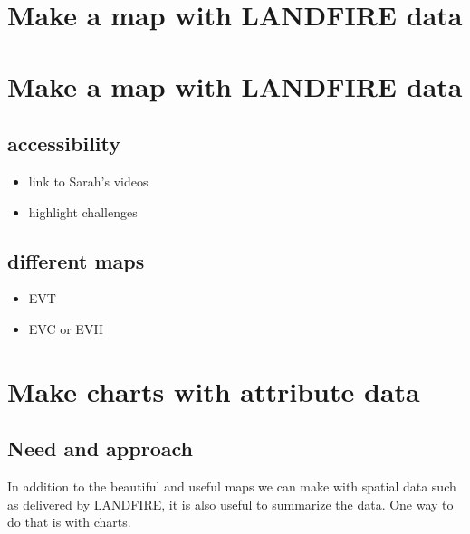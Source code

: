 \documentclass[
  letterpaper,
  DIV=11,
  numbers=noendperiod]{scrreprt}
\providecommand{\tightlist}{%
  \setlength{\itemsep}{0pt}\setlength{\parskip}{0pt}}\usepackage{longtable,booktabs,array}
\begin{document}
\hypertarget{make-a-map-with-landfire-data}{%
\chapter{Make a map with LANDFIRE
data}\label{make-a-map-with-landfire-data}}


\hypertarget{make-a-map-with-landfire-data-1}{%
\chapter{Make a map with LANDFIRE
data}\label{make-a-map-with-landfire-data-1}}

\hypertarget{accessibility}{%
\section{accessibility}\label{accessibility}}

\begin{itemize}
\tightlist
\item
  link to Sarah's videos
\item
  highlight challenges
\end{itemize}

\hypertarget{different-maps}{%
\section{different maps}\label{different-maps}}

\begin{itemize}
\tightlist
\item
  EVT
\item
  EVC or EVH
\end{itemize}


\hypertarget{make-charts-with-attribute-data}{%
\chapter{Make charts with attribute
data}\label{make-charts-with-attribute-data}}

\hypertarget{need-and-approach}{%
\section{Need and approach}\label{need-and-approach}}

In addition to the beautiful and useful maps we can make with spatial
data such as delivered by LANDFIRE, it is also useful to summarize the
data. One way to do that is with charts.
\end{document}
